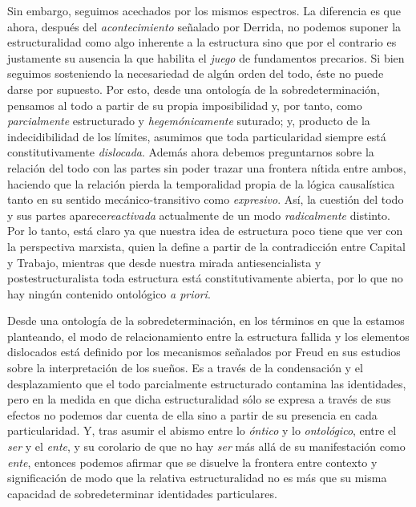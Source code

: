 \documentclass{book}
\begin{document}
Sin embargo, seguimos acechados por los mismos espectros. La diferencia
es que ahora, después del \emph{acontecimiento} señalado por Derrida, no
podemos suponer la estructuralidad como algo inherente a la estructura
sino que por el contrario es justamente su ausencia la que habilita el
\emph{juego} de fundamentos precarios. Si bien seguimos sosteniendo la
necesariedad de algún orden del todo, éste no puede darse por supuesto.
Por esto, desde una ontología de la sobredeterminación, pensamos al todo
a partir de su propia imposibilidad y, por tanto, como
\emph{parcialmente} estructurado y \emph{hegemónicamente} suturado; y,
producto de la indecidibilidad de los límites, asumimos que toda
particularidad siempre está constitutivamente \emph{dislocada}. Además
ahora debemos preguntarnos sobre la relación del todo con las partes sin
poder trazar una frontera nítida entre ambos, haciendo que la relación
pierda la temporalidad propia de la lógica causalística tanto en su
sentido mecánico-transitivo como \emph{expresivo}. Así, la cuestión del
todo y sus partes aparece\emph{reactivada} actualmente de un modo
\emph{radicalmente} distinto. Por lo tanto, está claro ya que nuestra
idea de estructura poco tiene que ver con la perspectiva marxista, quien
la define a partir de la contradicción entre Capital y Trabajo, mientras
que desde nuestra mirada antiesencialista y postestructuralista toda
estructura está constitutivamente abierta, por lo que no hay ningún
contenido ontológico \emph{a priori}.

Desde una ontología de la sobredeterminación, en los términos en que la
estamos planteando, el modo de relacionamiento entre la estructura
fallida y los elementos dislocados está definido por los mecanismos
señalados por Freud en sus estudios sobre la interpretación de los
sueños. Es a través de la condensación y el desplazamiento que el todo
parcialmente estructurado contamina las identidades, pero en la medida
en que dicha estructuralidad sólo se expresa a través de sus efectos no
podemos dar cuenta de ella sino a partir de su presencia en cada
particularidad. Y, tras asumir el abismo entre lo \emph{óntico} y lo
\emph{ontológico}, entre el \emph{ser} y el \emph{ente}, y su corolario
de que no hay \emph{ser} más allá de su manifestación como \emph{ente},
entonces podemos afirmar que se disuelve la frontera entre contexto y
significación de modo que la relativa estructuralidad no es más que su
misma capacidad de sobredeterminar identidades particulares.
\end{document}
